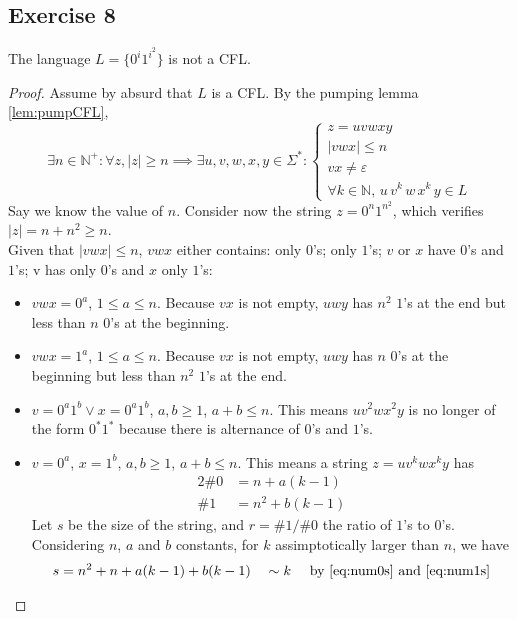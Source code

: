 \documentclass[docid=TP10]{tcom_TP}
\begin{document}
{\subsection{Exercise 8}
\begin{theorem}
The language $L=\{0^i1^{i^2}\}$ is not a CFL.
\end{theorem}
\begin{proof}
Assume by absurd that $L$ is a CFL. By the pumping lemma \eqref{lem:pumpCFL},
\begin{equation*}
	\exists n \in \mathbb{N}^+ \colon \forall z, |z|\geq n \implies \exists u, v, w, x, y \in \Sigma^* \colon 
	\begin{cases}
		z=uvwxy\\
		|vwx| \leq n\\
		vx \neq \varepsilon \\
		\forall k \in \mathbb{N},\,u\,v^k\,w\,x^k\,y \in L
	\end{cases}
\end{equation*}
Say we know the value of $n$. Consider now the string $z=0^n1^{n^2}$, which verifies $|z|=n+n^2 \geq n$. \\
Given that $|vwx|\leq n$, $vwx$ either contains: only $0$'s; only $1$'s; $v$ or $x$ have $0$'s and $1$'s; v has only $0$'s and $x$ only $1$'s:
\begin{itemize}
	\item $vwx=0^a$, $1 \leq a \leq n$. Because $vx$ is not empty, $uwy$ has $n^2$ $1$'s at the end but less than $n$ $0$'s at the beginning.
	\item $vwx=1^a$, $1 \leq a \leq n$. Because $vx$ is not empty, $uwy$ has $n$ $0$'s at the beginning but less than $n^2$ $1$'s at the end.
	\item $v=0^a1^b \vee x=0^a1^b$, $a,b \geq 1$, $a+b \leq n$. This means $uv^2wx^2y$ is no longer of the form $0^*1^*$ because there is alternance of $0$'s and $1$'s.
	\item $v=0^a$, $x=1^b$, $a,b \geq 1$, $a+b \leq n$. This means a string $z=uv^kwx^ky$ has
	\begin{alignat}{2}
		\label{eq:num0s} \# 0 &= n+a(k-1)\\
		\label{eq:num1s} \# 1 &= n^2+b(k-1)
	\end{alignat}
	Let $s$ be the size of the string, and $r=\#1/\#0$ the ratio of $1$'s to $0$'s. Considering $n$, $a$ and $b$ constants, for $k$ assimptotically larger than $n$, we have
	\begin{alignat}{3}
		\label{eq:sizerel0} s &= n^2+n+a(k-1)+b(k-1)         &&\sim k        &&\text{ by \eqref{eq:num0s} and \eqref{eq:num1s}} \\

\end{alignat}
\end{itemize}
\end{proof}}
\end{document}
